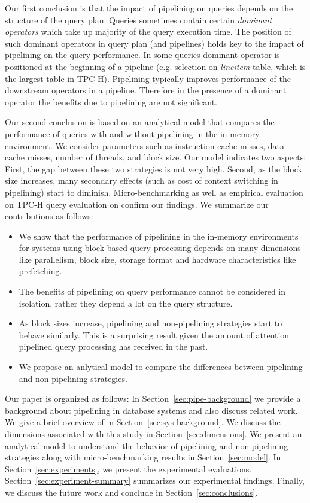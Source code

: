 Our first conclusion is that the impact of pipelining on queries depends on the structure of the query plan. 
Queries sometimes contain certain \textit{dominant operators} which take up majority of the query execution time.
The position of such dominant operators in query plan (and pipelines) holds key to the impact of pipelining on the query performance. 
In some queries dominant operator is positioned at the beginning of a pipeline (e.g. selection on \textit{lineitem} table, which is the largest table in TPC-H).
Pipelining typically improves performance of the downstream operators in a pipeline.
Therefore in the presence of a dominant operator the benefits due to pipelining are not significant. 

Our second conclusion is based on an analytical model that compares the performance of queries with and without pipelining in the in-memory environment. 
We consider parameters such as instruction cache misses, data cache misses, number of threads, and block size.
Our model indicates two aspects: First, the gap between these two strategies is not very high. 
Second, as the block size increases, many secondary effects (such as cost of context switching in pipelining) start to diminish.
Micro-benchmarking as well as empirical evaluation on TPC-H query evaluation on \sys{} confirm our findings. 
We summarize our contributions as follows:
\begin{itemize}
	\item We show that the performance of pipelining in the in-memory environments for systems using block-based query processing depends on many dimensions like parallelism, block size, storage format and hardware characteristics like prefetching. 
	\item The benefits of pipelining on query performance cannot be considered in isolation, rather they depend a lot on the query structure.
	\item As block sizes increase, pipelining and non-pipelining strategies start to behave similarly. This is a surprising result given the amount of attention pipelined query processing has received in the past. 
	\item We propose an anlytical model to compare the differences between pipelining and non-pipelining strategies.
\end{itemize}
Our paper is organized as follows: In Section~\ref{sec:pipe-background} we provide a background about pipelining in database systems and also discuss related work.
We give a brief overview of \sys{} in Section~\ref{sec:sys-background}.
We discuss the dimensions associated with this study in Section~\ref{sec:dimensions}.
We present an analytical model to understand the behavior of pipelining and non-pipelining strategies along with micro-benchmarking results in Section~\ref{sec:model}.
In Section~\ref{sec:experiments}, we present the experimental evaluations.
Section~\ref{sec:experiment-summary} summarizes our experimental findings.
Finally, we discuss the future work and conclude in Section~\ref{sec:conclusions}.